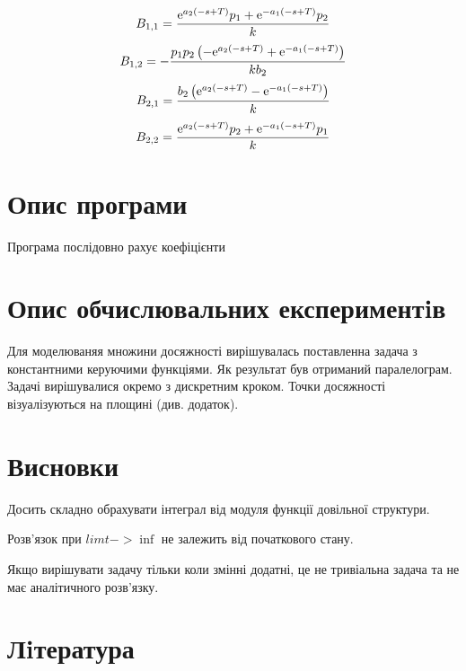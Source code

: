 \documentclass{article}
\begin{document}
\begin{equation}
B_{{1,1}}={\frac {{{\rm e}^{a_{{2}} \left( -s+T \right) }}p_{{1}}+{
{\rm e}^{-a_{{1}} \left( -s+T \right) }}p_{{2}}}{k}}
\end{equation}
\begin{equation}
B_{{1,2}}=-{\frac {p_{{1}}p_{{2}} \left( -{{\rm e}^{a_{{2}} \left( -s+
T \right) }}+{{\rm e}^{-a_{{1}} \left( -s+T \right) }} \right) }{kb_{{
2}}}}
\end{equation}
\begin{equation}
B_{{2,1}}={\frac {b_{{2}} \left( {{\rm e}^{a_{{2}} \left( -s+T
 \right) }}-{{\rm e}^{-a_{{1}} \left( -s+T \right) }} \right) }{k}}
\end{equation}
\begin{equation}
B_{{2,2}}={\frac {{{\rm e}^{a_{{2}} \left( -s+T \right) }}p_{{2}}+{
{\rm e}^{-a_{{1}} \left( -s+T \right) }}p_{{1}}}{k}}
\end{equation}
\section{Опис програми}

Програма послідовно рахує коефіцієнти

\section{Опис обчислювальних експериментiв}

Для моделюваняя множини досяжності вирішувалась поставленна задача з константними керуючими функціями. Як результат був отриманий паралелограм. Задачі вирішувалися окремо з дискретним кроком. Точки досяжності візуалізуються на площині (див. додаток).

\section{Висновки}

Досить складно обрахувати інтеграл від модуля функції довільної структури.

Розв'язок при $ lim t -> \inf $ не залежить від початкового стану.

Якщо вирішувати задачу тільки коли змінні додатні, це не тривіальна задача та не має аналітичного розв'язку.

\section{Лiтература}
\end{document}
